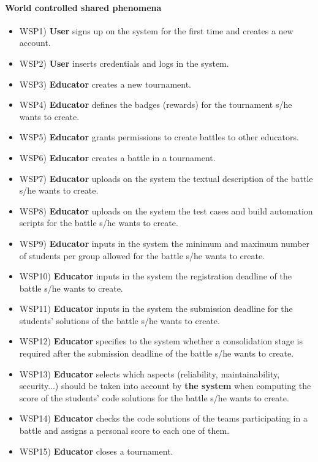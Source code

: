	\paragraph{World controlled shared phenomena}
	\begin{itemize}
		\item WSP1) \textbf{User} signs up on the system for the first time and creates a new account.
		\item WSP2) \textbf{User} inserts credentials and logs in the system.
		\item WSP3)  \textbf{Educator} creates a new tournament.
		\item WSP4) \textbf{Educator} defines the badges (rewards) for the tournament s/he wants to create.
		\item WSP5) \textbf{Educator} grants permissions to create battles to other educators.
		\item WSP6) \textbf{Educator} creates a battle in a tournament.
		\item WSP7) \textbf{Educator} uploads on the system the textual description of the battle s/he wants to create.
		\item WSP8) \textbf{Educator} uploads on the system the test cases and build automation scripts for the battle s/he wants to create.
		\item WSP9) \textbf{Educator} inputs in the system the minimum and maximum number of students per group allowed for the battle s/he wants to create.
		\item WSP10) \textbf{Educator} inputs in the system the registration deadline of the battle s/he wants to create.
		\item WSP11) \textbf{Educator} inputs in the system the submission deadline for the students’ solutions of the battle s/he wants to create.
		\item WSP12) \textbf{Educator} specifies to the system whether a consolidation stage is required after the submission deadline of the battle s/he wants to create.
		\item WSP13) \textbf{Educator} selects which aspects (reliability, maintainability, security...) should be taken into account by \textbf{the system} when computing the score of the students' code solutions for the battle s/he wants to create.
		\item WSP14) \textbf{Educator} checks the code solutions of the teams participating in a battle and assigns a personal score to each one of them.
		\item WSP15) \textbf{Educator} closes a tournament.

\end{itemize}
